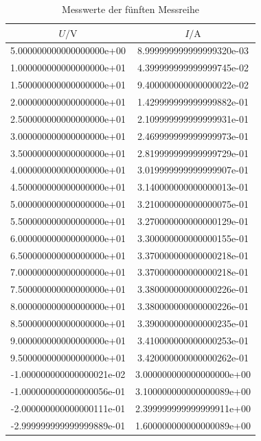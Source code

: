 \begin{table}
  \centering
  \caption{Messwerte der fünften Messreihe}
  \label{tab:Reihe5}
  \begin{tabular}{|S|S|}
    \toprule
    $U/\si{\volt}$ & $I/\si{\ampere}$ \\
    \midrule
    5.000000000000000000e+00 & 8.999999999999999320e-03\\
    1.000000000000000000e+01 & 4.399999999999999745e-02\\
    1.500000000000000000e+01 & 9.400000000000000022e-02\\
    2.000000000000000000e+01 & 1.429999999999999882e-01\\
    2.500000000000000000e+01 & 2.109999999999999931e-01\\
    3.000000000000000000e+01 & 2.469999999999999973e-01\\
    3.500000000000000000e+01 & 2.819999999999999729e-01\\
    4.000000000000000000e+01 & 3.019999999999999907e-01\\
    4.500000000000000000e+01 & 3.140000000000000013e-01\\
    5.000000000000000000e+01 & 3.210000000000000075e-01\\
    5.500000000000000000e+01 & 3.270000000000000129e-01\\
    6.000000000000000000e+01 & 3.300000000000000155e-01\\
    6.500000000000000000e+01 & 3.370000000000000218e-01\\
    7.000000000000000000e+01 & 3.370000000000000218e-01\\
    7.500000000000000000e+01 & 3.380000000000000226e-01\\
    8.000000000000000000e+01 & 3.380000000000000226e-01\\
    8.500000000000000000e+01 & 3.390000000000000235e-01\\
    9.000000000000000000e+01 & 3.410000000000000253e-01\\
    9.500000000000000000e+01 & 3.420000000000000262e-01\\
    -1.000000000000000021e-02 & 3.000000000000000000e+00\\
    -1.000000000000000056e-01 & 3.100000000000000089e+00\\
    -2.000000000000000111e-01 & 2.399999999999999911e+00\\
    -2.999999999999999889e-01 & 1.600000000000000089e+00\\

\end{tabular}
\end{table}
